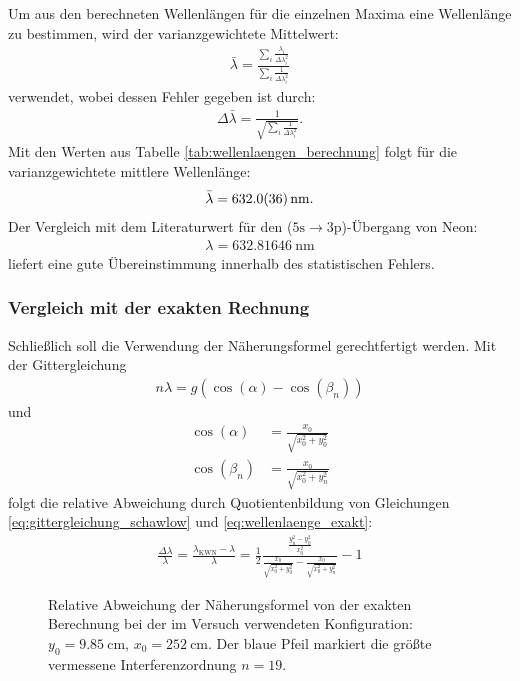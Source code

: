 \documentclass[11pt, a4paper]{article}
\numberwithin{equation}{section}
\begin{document}
Um aus den berechneten Wellenlängen für die einzelnen Maxima eine Wellenlänge zu bestimmen, wird der varianzgewichtete Mittelwert:
\begin{align}
	\bar{\lambda} = \frac{\sum_i \frac{\lambda_i}{\Delta \lambda_i^2}}{\sum_i \frac{1}{\Delta \lambda_i^2}}
\end{align}
verwendet, wobei dessen Fehler gegeben ist durch:
\begin{align}
\Delta \bar{\lambda} = \frac{1}{\sqrt{\sum_i \frac{1}{\Delta \lambda_i^2}}} \text{.}
\end{align}
Mit den Werten aus Tabelle \ref{tab:wellenlaengen_berechnung} folgt für die varianzgewichtete mittlere Wellenlänge:
\begin{align}
	\bar{\lambda} = \SI{632.0 +- 3.6}{\nano\metre} \text{.}
\end{align}
Der Vergleich mit dem Literaturwert \cite{NISTSpectra} für den ($\mathrm{5s} \rightarrow \mathrm{3p}$)-Übergang von Neon:
\begin{align}
	\lambda = \SI{632.81646}{\nano\metre}
\end{align}
liefert eine gute Übereinstimmung innerhalb des statistischen Fehlers.

\subsubsection{Vergleich mit der exakten Rechnung}
Schließlich soll die Verwendung der Näherungsformel gerechtfertigt werden.
Mit der Gittergleichung
\begin{align}
	n \lambda = g \left( \cos(\alpha) - \cos(\beta_n) \right)
	\label{eq:wellenlaenge_exakt}
\end{align}
und
\begin{align}
	\cos(\alpha) &= \frac{x_0}{\sqrt{x_0^2 + y_0^2}} \\
	\cos(\beta_n) &= \frac{x_0}{\sqrt{x_0^2 + y_n^2}}
\end{align}
folgt die relative Abweichung durch Quotientenbildung von Gleichungen \ref{eq:gittergleichung_schawlow} und \ref{eq:wellenlaenge_exakt}:
\begin{align}
	\frac{\Delta \lambda}{\lambda} = \frac{\lambda_\mathrm{KWN} - \lambda}{\lambda} = \frac{1}{2} \frac{\frac{y_n^2 - y_0^2}{x_0^2}}{ \frac{x_0}{\sqrt{x_0^2 + y_0^2}} - \frac{x_0}{\sqrt{x_0^2 + y_n^2}} } - 1
\end{align}

\begin{figure}[h]
	\centering
	
	\caption{Relative Abweichung der Näherungsformel von der exakten Berechnung bei der im Versuch verwendeten Konfiguration: $y_0 = \SI{9.85}{\centi\metre}$, $x_0 = \SI{252}{\centi\metre}$. Der blaue Pfeil markiert die größte vermessene Interferenzordnung $n = 19$.}
	\label{fig:abweichung_wellenlaenge}
\end{figure}
\end{document}
